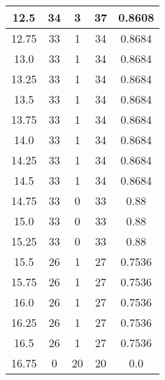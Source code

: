 \documentclass[letterpaper, 12pt]{article}
\begin{document}
\begin{longtable}{|c|c|c|c|c|}
12.5 & 34 & 3 & 37 & 0.8608 \\
\hline
12.75 & 33 & 1 & 34 & 0.8684 \\
\hline
13.0 & 33 & 1 & 34 & 0.8684 \\
\hline
13.25 & 33 & 1 & 34 & 0.8684 \\
\hline
13.5 & 33 & 1 & 34 & 0.8684 \\
\hline
13.75 & 33 & 1 & 34 & 0.8684 \\
\hline
14.0 & 33 & 1 & 34 & 0.8684 \\
\hline
14.25 & 33 & 1 & 34 & 0.8684 \\
\hline
14.5 & 33 & 1 & 34 & 0.8684 \\
\hline
14.75 & 33 & 0 & 33 & 0.88 \\
\hline
15.0 & 33 & 0 & 33 & 0.88 \\
\hline
15.25 & 33 & 0 & 33 & 0.88 \\
\hline
15.5 & 26 & 1 & 27 & 0.7536 \\
\hline
15.75 & 26 & 1 & 27 & 0.7536 \\
\hline
16.0 & 26 & 1 & 27 & 0.7536 \\
\hline
16.25 & 26 & 1 & 27 & 0.7536 \\
\hline
16.5 & 26 & 1 & 27 & 0.7536 \\
\hline
16.75 & 0 & 20 & 20 & 0.0 \\
\hline
\end{longtable}
\end{document}
